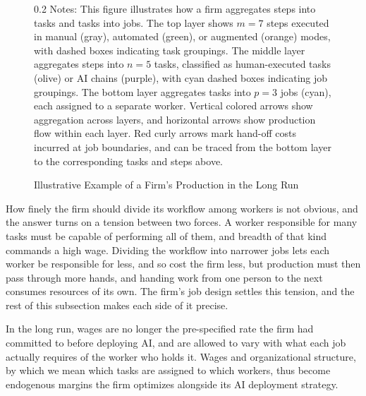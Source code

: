 \begin{figure}[!t]
  \centering
  \caption{Illustrative Example of a Firm's Production in the Long Run}
  \label{fig:hierarchical_production}
  

  \par\vspace{\fignotesskip}
\begin{minipage}{1\linewidth}
\begin{spacing}{0.2}
{\fontsize{9.5pt}{10pt}\selectfont Notes: This figure illustrates how a firm aggregates steps into tasks and tasks into jobs.
The top layer shows $m=7$ steps executed in manual (gray), automated (green), or augmented (orange) modes, with dashed boxes indicating task groupings.
The middle layer aggregates steps into $n=5$ tasks, classified as human-executed tasks (olive) or AI chains (purple), with cyan dashed boxes indicating job groupings.
The bottom layer aggregates tasks into $p=3$ jobs (cyan), each assigned to a separate worker.
Vertical colored arrows show aggregation across layers, and horizontal arrows show production flow within each layer.
Red curly arrows mark hand-off costs incurred at job boundaries, and can be traced from the bottom layer to the corresponding tasks and steps above.}
\end{spacing}
\end{minipage}
\end{figure}

How finely the firm should divide its workflow among workers is not obvious, and the answer turns on a tension between two forces.
A worker responsible for many tasks must be capable of performing all of them, and breadth of that kind commands a high wage.
Dividing the workflow into narrower jobs lets each worker be responsible for less, and so cost the firm less, but production must then pass through more hands, and handing work from one person to the next consumes resources of its own.
The firm's job design settles this tension, and the rest of this subsection makes each side of it precise.

In the long run, wages are no longer the pre-specified rate the firm had committed to before deploying AI, and are allowed to vary with what each job actually requires of the worker who holds it.
Wages and organizational structure, by which we mean which tasks are assigned to which workers, thus become endogenous margins the firm optimizes alongside its AI deployment strategy.

